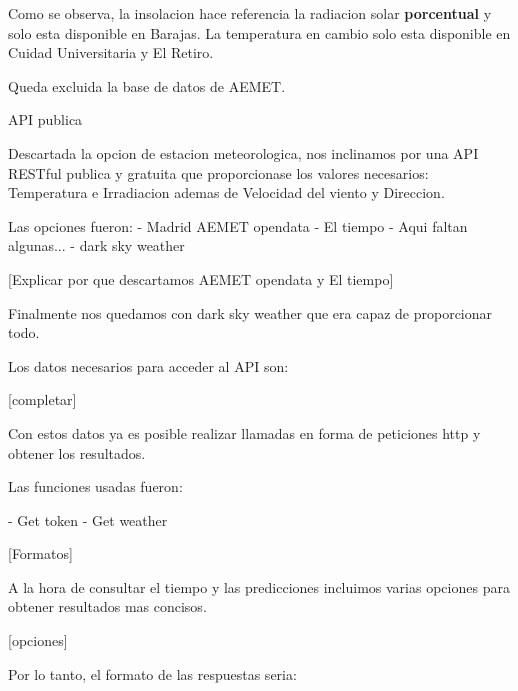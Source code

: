 







Como se observa, la insolacion hace referencia la radiacion solar \textbf{porcentual} y solo esta disponible en Barajas.
La temperatura en cambio solo esta disponible en Cuidad Universitaria y El Retiro.

Queda excluida la base de datos de AEMET.

API publica

Descartada la opcion de estacion meteorologica, nos inclinamos por una API RESTful publica y gratuita que proporcionase los valores necesarios: Temperatura e Irradiacion ademas de Velocidad del viento y Direccion.

Las opciones fueron:
- Madrid AEMET opendata
- El tiempo
- Aqui faltan algunas...
- dark sky weather

[Explicar por que descartamos AEMET opendata y El tiempo]

Finalmente nos quedamos con dark sky weather que era capaz de proporcionar todo.

Los datos necesarios para acceder al API son:

[completar]

Con estos datos ya es posible realizar llamadas en forma de peticiones http y obtener los resultados.

Las funciones usadas fueron:

- Get token
- Get weather

[Formatos]

A la hora de consultar el tiempo y las predicciones incluimos varias opciones para obtener resultados mas concisos.

[opciones]

Por lo tanto, el formato de las respuestas seria:

